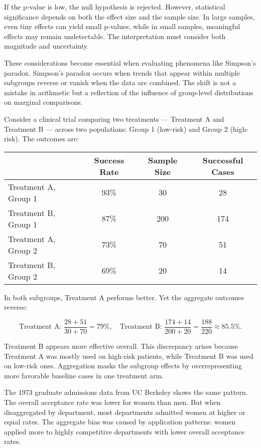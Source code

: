 If the p-value is low, the null hypothesis is rejected. However, statistical significance depends on both the effect size and the sample size. In large samples, even tiny effects can yield small p-values, while in small samples, meaningful effects may remain undetectable. The interpretation must consider both magnitude and uncertainty.

These considerations become essential when evaluating phenomena like Simpson’s paradox. Simpson’s paradox occurs when trends that appear within multiple subgroups reverse or vanish when the data are combined. The shift is not a mistake in arithmetic but a reflection of the influence of group-level distributions on marginal comparisons.

Consider a clinical trial comparing two treatments — Treatment A and Treatment B — across two populations: Group 1 (low-risk) and Group 2 (high-risk). The outcomes are:

\begin{center}
\begin{tabular}{lccc}
\toprule
 & Success Rate & Sample Size & Successful Cases \\
\midrule
Treatment A, Group 1 & 93\% & 30 & 28 \\
Treatment B, Group 1 & 87\% & 200 & 174 \\
Treatment A, Group 2 & 73\% & 70 & 51 \\
Treatment B, Group 2 & 69\% & 20 & 14 \\
\bottomrule
\end{tabular}
\end{center}

In both subgroups, Treatment A performs better. Yet the aggregate outcomes reverse:

\[
\text{Treatment A: } \frac{28 + 51}{30 + 70} = 79\%, \quad
\text{Treatment B: } \frac{174 + 14}{200 + 20} = \frac{188}{220} \approx 85.5\%.
\]

Treatment B appears more effective overall. This discrepancy arises because Treatment A was mostly used on high-risk patients, while Treatment B was used on low-risk ones. Aggregation masks the subgroup effects by overrepresenting more favorable baseline cases in one treatment arm.

The 1973 graduate admissions data from UC Berkeley shows the same pattern. The overall acceptance rate was lower for women than men. But when disaggregated by department, most departments admitted women at higher or equal rates. The aggregate bias was caused by application patterns: women applied more to highly competitive departments with lower overall acceptance rates.

